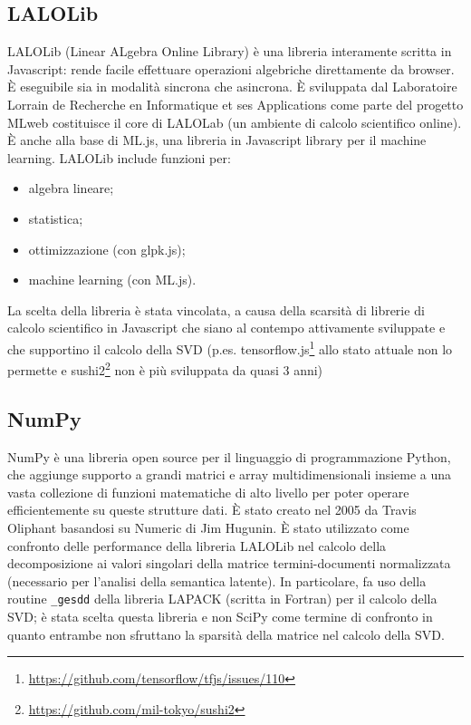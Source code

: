 \FloatBarrier

\subsection{LALOLib}
LALOLib (Linear ALgebra Online Library) è una libreria interamente scritta in Javascript: rende facile effettuare operazioni algebriche direttamente da browser. È eseguibile sia in modalità sincrona che asincrona. È sviluppata dal Laboratoire Lorrain de Recherche en Informatique et ses Applications come parte del progetto MLweb costituisce il core di LALOLab (un ambiente di calcolo scientifico online). È anche alla base di ML.js, una libreria in Javascript library per il machine learning. 
LALOLib include funzioni per:
\begin{itemize}
    \item algebra lineare;
    \item statistica;
    \item ottimizzazione (con glpk.js);
    \item machine learning (con ML.js).
\end{itemize}

La scelta della libreria è stata vincolata, a causa della scarsità di librerie di calcolo scientifico in Javascript che siano al contempo attivamente sviluppate e che supportino il calcolo della SVD (p.es. tensorflow.js\footnote{\url{https://github.com/tensorflow/tfjs/issues/110}} allo stato attuale non lo permette e sushi2\footnote{\url{https://github.com/mil-tokyo/sushi2}} non è più sviluppata da quasi 3 anni) 

\subsection{NumPy}
NumPy è una libreria open source per il linguaggio di programmazione Python, che aggiunge supporto a grandi matrici e array multidimensionali insieme a una vasta collezione di funzioni matematiche di alto livello per poter operare efficientemente su queste strutture dati. È stato creato nel 2005 da Travis Oliphant basandosi su Numeric di Jim Hugunin. È stato utilizzato come confronto delle performance della libreria LALOLib nel calcolo della decomposizione ai valori singolari della matrice termini-documenti normalizzata (necessario per l'analisi della semantica latente). In particolare, fa uso della routine \texttt{\_gesdd} della libreria LAPACK (scritta in Fortran) per il calcolo della SVD; è stata scelta questa libreria e non SciPy come termine di confronto in quanto entrambe non sfruttano la sparsità della matrice nel calcolo della SVD.

